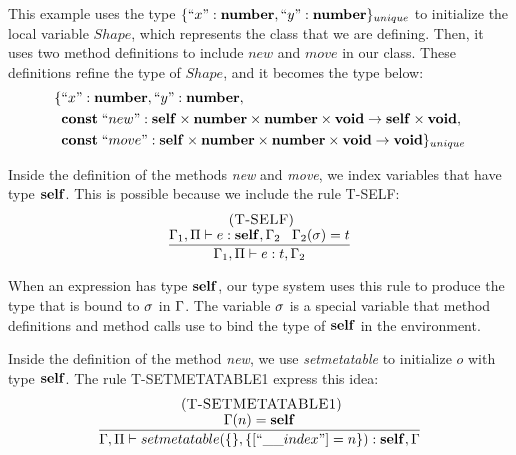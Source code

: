 This example uses the type $\{``x":\mathbf{number}, ``y":\mathbf{number}\}_{unique}$ to
initialize the local variable $Shape$, which represents the class
that we are defining.
Then, it uses two method definitions to include $new$ and $move$ in our class.
These definitions refine the type of $Shape$, and it becomes the type below:
\begin{align*}
\{ & ``x":\mathbf{number}, ``y":\mathbf{number},\\
   & \mathbf{const} \; ``new":\mathbf{self} \times \mathbf{number} \times \mathbf{number} \times \mathbf{void} \rightarrow \mathbf{self} \times \mathbf{void},\\
   & \mathbf{const} \; ``move":\mathbf{self} \times \mathbf{number} \times \mathbf{number} \times \mathbf{void} \rightarrow \mathbf{void} \}_{unique}
\end{align*}

Inside the definition of the methods \emph{new} and \emph{move},
we index variables that have type $\mathbf{self}$.
This is possible because we include the rule \textsc{T-SELF}:
\[
\begin{array}{c}
\; (\textsc{T-SELF})\\
\dfrac{\Gamma_{1}, \Pi \vdash e:\mathbf{self}, \Gamma_{2} \;\;\;
       \Gamma_{2}(\sigma) = t}
      {\Gamma_{1}, \Pi \vdash e:t, \Gamma_{2}}
\end{array}
\]

When an expression has type $\mathbf{self}$, our type system uses this
rule to produce the type that is bound to $\sigma$ in $\Gamma$.
The variable $\sigma$ is a special variable that method definitions
and method calls use to bind the type of $\mathbf{self}$ in the environment.

Inside the definition of the method \emph{new}, we use \emph{setmetatable}
to initialize $o$ with type $\mathbf{self}$.
The rule \textsc{T-SETMETATABLE1} express this idea:
\[
\begin{array}{c}
\mylabel{T-SETMETATABLE1}\\
\dfrac{\env(n) = \Self}
      {\env, \penv \vdash setmetatable(\{\}, \{[``\string_\string_index"] = n\}):\Self, \env}
\end{array}
\]


